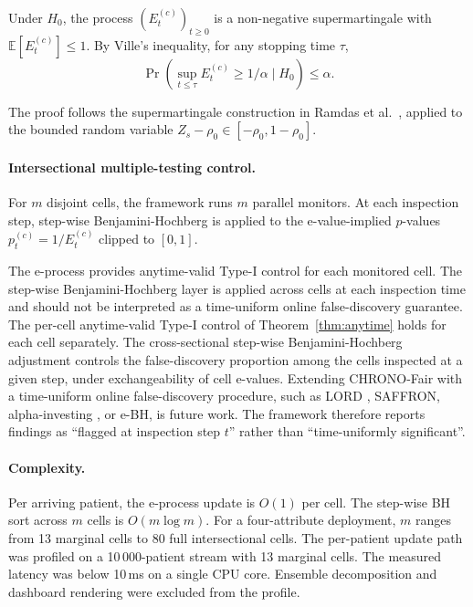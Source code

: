 \documentclass[acmsmall,nonacm,review,anonymous]{acmart}
\newcommand{\E}{\mathbb{E}}
\newcommand{\1}[1]{\mathbf{1}\!\left\{#1\right\}}
\begin{document}
\begin{theorem}\label{thm:anytime}
Under $H_0$, the process $(E_t^{(c)})_{t \ge 0}$ is a non-negative supermartingale with $\E[E_t^{(c)}] \le 1$. By Ville's inequality, for any stopping time $\tau$,
\begin{equation}
\Pr(\sup_{t \le \tau} E_t^{(c)} \ge 1/\alpha \mid H_0) \le \alpha.
\end{equation}
\end{theorem}

The proof follows the supermartingale construction in Ramdas et al.\ \cite{ramdas2023}, applied to the bounded random variable $Z_s - \rho_0 \in [-\rho_0, 1 - \rho_0]$.

\paragraph{Intersectional multiple-testing control.}

For $m$ disjoint cells, the framework runs $m$ parallel monitors. At each inspection step, step-wise Benjamini-Hochberg \cite{benjamini1995fdr} is applied to the e-value-implied $p$-values $p_t^{(c)} = 1/E_t^{(c)}$ clipped to $[0,1]$.

The e-process provides anytime-valid Type-I control for each monitored cell. The step-wise Benjamini-Hochberg layer is applied across cells at each inspection time and should not be interpreted as a time-uniform online false-discovery guarantee. The per-cell anytime-valid Type-I control of Theorem~\ref{thm:anytime} holds for each cell separately. The cross-sectional step-wise Benjamini-Hochberg adjustment controls the false-discovery proportion among the cells inspected at a given step, under exchangeability of cell e-values. Extending CHRONO-Fair with a time-uniform online false-discovery procedure, such as LORD \cite{javanmard2018}, SAFFRON, alpha-investing \cite{foster2008}, or e-BH, is future work. The framework therefore reports findings as ``flagged at inspection step $t$'' rather than ``time-uniformly significant''.

\paragraph{Complexity.}

Per arriving patient, the e-process update is $O(1)$ per cell. The step-wise BH sort across $m$ cells is $O(m \log m)$. For a four-attribute deployment, $m$ ranges from 13 marginal cells to 80 full intersectional cells. The per-patient update path was profiled on a 10\,000-patient stream with 13 marginal cells. The measured latency was below 10\,ms on a single CPU core. Ensemble decomposition and dashboard rendering were excluded from the profile.
\end{document}

